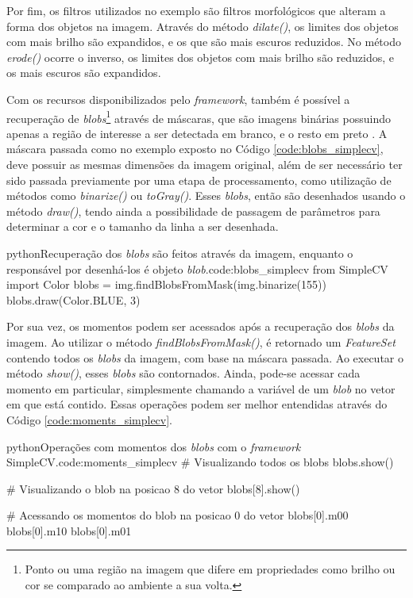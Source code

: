Por fim, os filtros utilizados no exemplo são filtros morfológicos que alteram a forma dos objetos na imagem. Através do método \textit{dilate()}, os limites dos objetos com mais brilho são expandidos, e os que são mais escuros reduzidos. No método \textit{erode()} ocorre o inverso, os limites dos objetos com mais brilho são reduzidos, e os mais escuros são expandidos.

Com os recursos disponibilizados pelo \textit{framework}, também é possível a recuperação de \textit{blobs}\footnote{Ponto ou uma região na imagem que difere em propriedades como brilho ou cor se comparado ao ambiente a sua volta.} através de máscaras, que são imagens binárias possuindo apenas a região de interesse a ser detectada em branco, e o resto em preto \cite{RAHMAN}. A máscara passada como no exemplo exposto no Código \ref{code:blobs_simplecv}, deve possuir as mesmas dimensões da imagem original, além de ser necessário ter sido passada previamente por uma etapa de processamento, como utilização de métodos como \textit{binarize()} ou \textit{toGray()}. Esses \textit{blobs}, então são desenhados usando o método \textit{draw()}, tendo ainda a possibilidade de passagem de parâmetros para determinar a cor e o tamanho da linha a ser desenhada.

\begin{code}{python}{Recuperação dos \textit{blobs} são feitos através da imagem, enquanto o responsável por desenhá-los é objeto \textit{blob}.}{code:blobs_simplecv}
from SimpleCV import Color
blobs = img.findBlobsFromMask(img.binarize(155))
blobs.draw(Color.BLUE, 3)
\end{code}

Por sua vez, os momentos podem ser acessados após a recuperação dos \textit{blobs} da imagem. Ao utilizar o método \textit{findBlobsFromMask()}, é retornado um \textit{FeatureSet} contendo todos os \textit{blobs} da imagem, com base na máscara passada. Ao executar o método \textit{show()}, esses \textit{blobs} são contornados. Ainda, pode-se acessar cada momento em particular, simplesmente chamando a variável de um \textit{blob} no vetor em que está contido. Essas operações podem ser melhor entendidas através do Código \ref{code:moments_simplecv}.

\begin{code}{python}{Operações com momentos dos \textit{blobs} com o \textit{framework} SimpleCV.}{code:moments_simplecv}
# Visualizando todos os blobs
blobs.show()

# Visualizando o blob na posicao 8 do vetor
blobs[8].show()

# Acessando os momentos do blob na posicao 0 do vetor
blobs[0].m00
blobs[0].m10
blobs[0].m01
\end{code}

